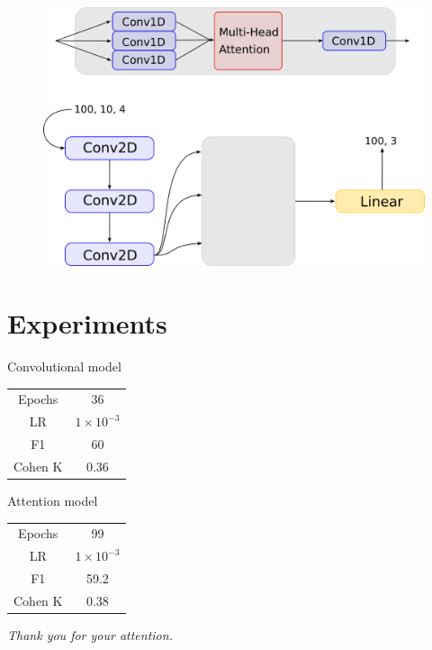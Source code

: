 \documentclass{beamer}
\begin{document}
\begin{frame}
    \begin{figure}
        \centering
        \includegraphics[scale=0.35]{imgs/attention.png}
    \end{figure}
\end{frame}


\section{Experiments}
\begin{frame}{Convolutional model}
    \begin{center}
        \begin{tabular}{ c c }
            \hline
            Epochs  & 36                 \\
            LR      & $1 \times 10^{-3}$ \\
            F1      & 60                 \\
            Cohen K & 0.36               \\
            \hline
        \end{tabular}
    \end{center}
\end{frame}

\begin{frame}{Attention model}
    \begin{center}
        \begin{tabular}{ c c }
            \hline
            Epochs  & 99                 \\
            LR      & $1 \times 10^{-3}$ \\
            F1      & 59.2               \\
            Cohen K & 0.38               \\
            \hline
        \end{tabular}
    \end{center}
\end{frame}

\begin{frame}
    \centering
    \huge{\textit{Thank you for your attention.}}
\end{frame}
\end{document}
